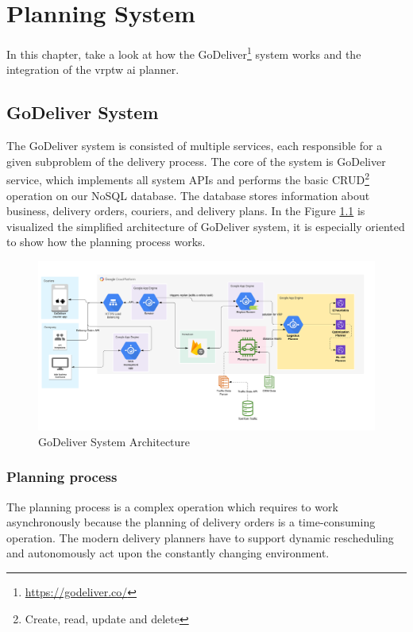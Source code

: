 \chapter{Planning System}\label{system}

In this chapter, take a look at how the GoDeliver\footnote{\url{https://godeliver.co/}} system works and the integration of the \gls{vrptw} \gls{ai} planner.

\section{GoDeliver System}

The GoDeliver system is consisted of multiple services, each responsible for a given subproblem of the delivery process. The core of the system is GoDeliver service, which implements all system APIs and performs the basic CRUD\footnote{Create, read, update and delete} operation on our NoSQL database. The database stores information about business, delivery orders, couriers, and delivery plans. In the Figure \ref{fig:godeliver-system} is visualized the simplified architecture of GoDeliver system, it is especially oriented to show how the planning process works.

\begin{figure}[ht]
    \centering
    \includegraphics[width=1.0\textwidth]{resources/implementation/godeliver-system.png}
    \caption{GoDeliver System Architecture}
    \label{fig:godeliver-system}
\end{figure}

\subsection{Planning process}
The planning process is a complex operation which requires to work asynchronously because the planning of delivery orders is a time-consuming operation. The modern delivery planners have to support dynamic rescheduling and autonomously act upon the constantly changing environment.

